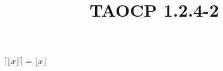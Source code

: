 \documentclass{article}
\title{TAOCP 1.2.4\mbox{-}2}
\begin{document}
\maketitle

\( \lceil \lfloor x \rfloor \rceil = \lfloor x \rfloor \)
\end{document}
